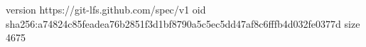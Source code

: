 version https://git-lfs.github.com/spec/v1
oid sha256:a74824c85feadea76b2851f3d1bf8790a5c5ec5dd47af8c6fffb4d032fe0377d
size 4675
